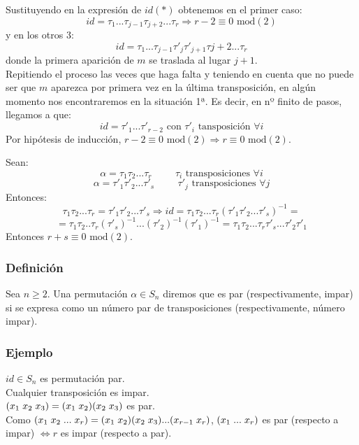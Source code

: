 \documentclass[11pt,a4paper]{article}
\begin{document}
Sustituyendo en la expresión de $id (*)$ obtenemos en el primer caso:
$$id = \tau_{1} ... \tau_{j-1} \tau_{j+2} ... \tau_{r} \Rightarrow r - 2 \equiv 0 \text{ mod}(2)$$
y en los otros 3:
$$id = \tau_{1} ... \tau_{j-1} \tau'_{j} \tau'_{j+1} \tau{j+2} ... \tau_{r}$$
donde la primera aparición de $m$ se traslada al lugar $j+1$. \\
Repitiendo el proceso las veces que haga falta y teniendo en cuenta que no puede ser que $m$ aparezca por primera vez en la última transposición, en algún momento nos encontraremos en la situación 1ª. Es decir, en nº finito de pasos, llegamos a que:
$$id = \tau'_{1} ... \tau'_{r-2} \text{ con } \tau'_{i} \text{ tansposición } \forall i$$
Por hipótesis de inducción, $r-2 \equiv 0 \text{ mod}(2) \Rightarrow r \equiv 0 \text{ mod}(2)$.

Sean:
$$\alpha=\tau_{1} \tau_{2} ... \tau_{r} \hspace{1cm} \tau_{i} \text{ transposiciones } \forall i$$
$$\alpha=\tau'_{1} \tau'_{2} ... \tau'_{s} \hspace{1cm} \tau'_{j} \text{ transposiciones } \forall j$$
Entonces:
$$\tau_{1} \tau_{2} ... \tau_{r} = \tau'_{1} \tau'_{2} ... \tau'_{s} \Rightarrow id = \tau_{1} \tau_{2} ... \tau_{r} (\tau'_{1} \tau'_{2} ... \tau'_{s})^{-1} =$$ $$= \tau_{1} \tau_{2} .. \tau_{r} (\tau'_{s})^{-1} ... (\tau'_{2})^{-1} (\tau'_{1})^{-1} = \tau_{1} \tau_{2} ... \tau_{r} \tau'_{s} ... \tau'_{2} \tau'_{1}$$
Entonces $r+s \equiv 0 \text{ mod}(2)$.

\subsubsection*{Definición}

Sea $n \geq 2$. Una permutación $\alpha \in S_{n}$ diremos que es par (respectivamente, impar) si se expresa como un número par de transposiciones (respectivamente, número impar).

\subsubsection*{Ejemplo}

$id \in S_{n}$ es permutación par. \\
Cualquier transposición es impar. \\
$(x_{1} \hspace{0.1cm} x_{2} \hspace{0.1cm} x_{3}) = (x_{1} \hspace{0.1cm} x_{2}) (x_{2} \hspace{0.1cm} x_{3})$ es par. \\
Como $(x_{1} \hspace{0.1cm} x_{2} \hspace{0.1cm} ... \hspace{0.1cm} x_{r}) = (x_{1} \hspace{0.1cm} x_{2}) (x_{2} \hspace{0.1cm} x_{3}) ... (x_{r-1} \hspace{0.1cm} x_{r})$, $(x_{1} \hspace{0.1cm} ... \hspace{0.1cm} x_{r})$ es par (respecto a impar) $\iff r$ es impar (respecto a par).
\end{document}
